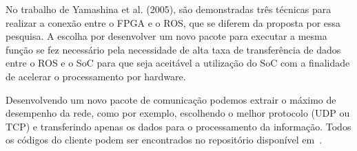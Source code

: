 No trabalho de Yamashina et al. (2005), são demonstradas três técnicas para realizar a conexão entre o FPGA e o ROS, que se diferem da proposta por essa pesquisa. A escolha por desenvolver um novo pacote para executar a mesma função se fez necessário pela necessidade de alta taxa de transferência de dados entre o ROS e o SoC para que seja aceitável a utilização do SoC com a finalidade de acelerar o processamento por hardware. 

Desenvolvendo um novo pacote de comunicação podemos extrair o máximo de desempenho da rede, como por  exemplo, escolhendo o melhor protocolo (UDP ou TCP) e transferindo apenas os dados para o processamento da informação. Todos os códigos do cliente podem ser encontrados no repositório disponível em~\cite{interface-socket}.

